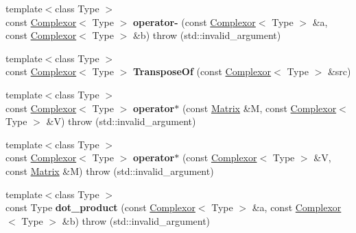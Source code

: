 \begin{DoxyCompactItemize}
\item 
\mbox{\label{namespacekerbal_1_1math_ade7e2c35b0e9127988c50f155ba8637b}} 
{\footnotesize template$<$class Type $>$ }\\const \hyperlink{classkerbal_1_1math_1_1_complexor}{Complexor}$<$ Type $>$ {\bfseries operator-\/} (const \hyperlink{classkerbal_1_1math_1_1_complexor}{Complexor}$<$ Type $>$ \&a, const \hyperlink{classkerbal_1_1math_1_1_complexor}{Complexor}$<$ Type $>$ \&b)  throw (std\+::invalid\+\_\+argument)
\item 
\mbox{\label{namespacekerbal_1_1math_adcd137ab58654bf8c05579857d3992f3}} 
{\footnotesize template$<$class Type $>$ }\\const \hyperlink{classkerbal_1_1math_1_1_complexor}{Complexor}$<$ Type $>$ {\bfseries Transpose\+Of} (const \hyperlink{classkerbal_1_1math_1_1_complexor}{Complexor}$<$ Type $>$ \&src)
\item 
\mbox{\label{namespacekerbal_1_1math_a8382b1d0f2923b21ba5d60c85ee90e42}} 
{\footnotesize template$<$class Type $>$ }\\const \hyperlink{classkerbal_1_1math_1_1_complexor}{Complexor}$<$ Type $>$ {\bfseries operator$\ast$} (const \hyperlink{classkerbal_1_1math_1_1_matrix}{Matrix} \&M, const \hyperlink{classkerbal_1_1math_1_1_complexor}{Complexor}$<$ Type $>$ \&V)  throw (std\+::invalid\+\_\+argument)
\item 
\mbox{\label{namespacekerbal_1_1math_ab71fbd3ef606dc371f7042e234bcdaea}} 
{\footnotesize template$<$class Type $>$ }\\const \hyperlink{classkerbal_1_1math_1_1_complexor}{Complexor}$<$ Type $>$ {\bfseries operator$\ast$} (const \hyperlink{classkerbal_1_1math_1_1_complexor}{Complexor}$<$ Type $>$ \&V, const \hyperlink{classkerbal_1_1math_1_1_matrix}{Matrix} \&M)  throw (std\+::invalid\+\_\+argument)
\item 
\mbox{\label{namespacekerbal_1_1math_ae6723286db65f24b344713fa8392d593}} 
{\footnotesize template$<$class Type $>$ }\\const Type {\bfseries dot\+\_\+product} (const \hyperlink{classkerbal_1_1math_1_1_complexor}{Complexor}$<$ Type $>$ \&a, const \hyperlink{classkerbal_1_1math_1_1_complexor}{Complexor}$<$ Type $>$ \&b)  throw (std\+::invalid\+\_\+argument)

\end{DoxyCompactItemize}

